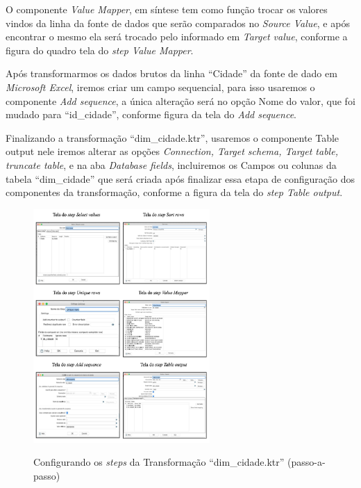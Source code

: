 O componente \textit{Value Mapper}, em s\'{i}ntese tem como fun\c{c}\~{a}o trocar os valores vindos da linha da fonte de dados que ser\~{a}o comparados no \textit{Source Value}, e ap\'os encontrar o mesmo ela ser\'{a} trocado pelo informado em \textit{Target value}, conforme a figura do quadro tela do \textit{step Value Mapper}.

Ap\'os transformarmos os dados brutos da linha ``Cidade'' da fonte de dado em \textit{Microsoft Excel}, iremos criar um campo sequencial, para isso usaremos o componente \textit{Add sequence}, a única altera\c{c}\~{a}o ser\'{a} no op\c{c}\~{a}o Nome do valor, que foi mudado para ``id\_cidade'', conforme figura da tela do \textit{Add sequence}.

Finalizando a transforma\c{c}\~{a}o ``dim\_cidade.ktr'', usaremos o componente Table output nele iremos alterar as op\c{c}\~{o}es \textit{Connection, Target schema, Target table, truncate table}, e na aba \textit{Database fields}, incluiremos os Campos ou colunas da tabela ``dim\_cidade'' que ser\'{a} criada ap\'os finalizar essa etapa de configura\c{c}\~{a}o dos componentes da transforma\c{c}\~{a}o, conforme a figura da tela do \textit{step Table output}.

\begin{figure}[H]
	\vspace*{0,2cm}
    \centering
    \caption{Configurando os \textit{steps} da Transforma\c{c}\~{a}o ``dim\_cidade.ktr'' (passo-a-passo)}
    \includegraphics[width=0.6\textwidth]{./04-figuras/figura-dim-cidade-passo-a-passo}
    \label{fig:ilustfigstepdimcidade}
\end{figure}
\vspace*{-0,9cm}
{\raggedright {}} \\

